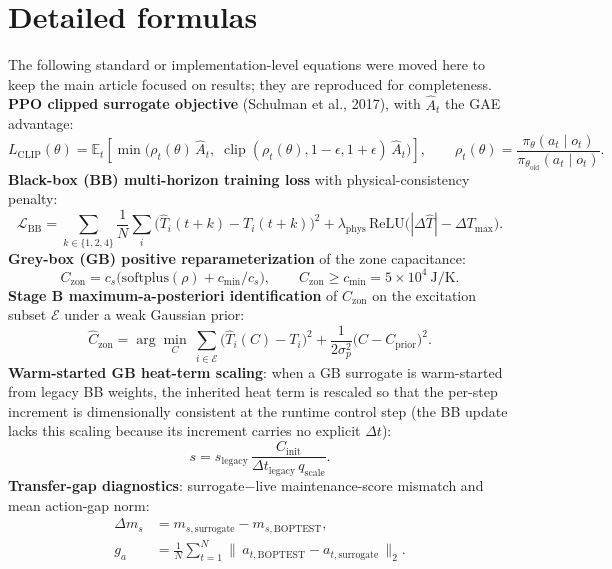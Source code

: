 \documentclass[11pt,a4paper]{article}
\newcommand{\Czon}{\ensuremath{C_{\mathrm{zon}}}}
\newcommand{\That}{\ensuremath{\widehat{T}}}
\begin{document}
\section*{Detailed formulas}
The following standard or implementation-level equations were moved here to keep the main
article focused on results; they are reproduced for completeness.
\noindent\textbf{PPO clipped surrogate objective} (Schulman et al., 2017), with $\hat{A}_t$ the GAE advantage:
\begin{equation}
L_{\mathrm{CLIP}}(\theta)=\mathbb{E}_t\!\left[\min\!\big(\rho_t(\theta)\,\hat{A}_t,\;
\operatorname{clip}(\rho_t(\theta),1-\epsilon,1+\epsilon)\,\hat{A}_t\big)\right],
\qquad \rho_t(\theta)=\frac{\pi_\theta(a_t\mid o_t)}{\pi_{\theta_{\mathrm{old}}}(a_t\mid o_t)}.
\end{equation}
\noindent\textbf{Black-box (BB) multi-horizon training loss} with physical-consistency penalty:
\begin{equation}
 \mathcal{L}_{\mathrm{BB}}
 = \sum_{k\in\{1,2,4\}} \frac{1}{N}\sum_{i}\big(\That_i(t{+}k)-T_i(t{+}k)\big)^2
 + \lambda_{\mathrm{phys}}\,\mathrm{ReLU}\!\big(|\Delta\That|-\Delta T_{\max}\big).
\end{equation}
\noindent\textbf{Grey-box (GB) positive reparameterization} of the zone capacitance:
\begin{equation}
 \Czon = c_s\big(\mathrm{softplus}(\rho) + c_{\min}/c_s\big),
 \qquad \Czon \ge c_{\min} = 5\times10^4~\mathrm{J/K}.
\end{equation}
\noindent\textbf{Stage B maximum-a-posteriori identification} of $\Czon$ on the excitation subset $\mathcal{E}$ under a weak Gaussian prior:
\begin{equation}
 \widehat{C}_{\mathrm{zon}}
 = \arg\min_{C}\ \sum_{i\in\mathcal{E}}\big(\That_i(C)-T_i\big)^2
 + \frac{1}{2\sigma_p^2}\big(C-C_{\mathrm{prior}}\big)^2.
\end{equation}
\noindent\textbf{Warm-started GB heat-term scaling}: when a GB surrogate is warm-started from legacy BB weights, the inherited heat term is rescaled so that the per-step increment is dimensionally consistent at the runtime control step (the BB update lacks this scaling because its increment carries no explicit $\Delta t$):
\begin{equation}
 s = s_{\mathrm{legacy}}\,\frac{C_{\mathrm{init}}}{\Delta t_{\mathrm{legacy}}\,q_{\mathrm{scale}}}.
\end{equation}
\noindent\textbf{Transfer-gap diagnostics}: surrogate$-$live maintenance-score mismatch and mean action-gap norm:
\begin{equation}
\begin{aligned}
 \Delta m_s &= m_{s,\mathrm{surrogate}} - m_{s,\mathrm{BOPTEST}}, \\
 g_a &= \frac{1}{N}\sum_{t=1}^{N}\big\|\,a_{t,\mathrm{BOPTEST}}-a_{t,\mathrm{surrogate}}\,\big\|_{2}.
\end{aligned}
\end{equation}
\end{document}
